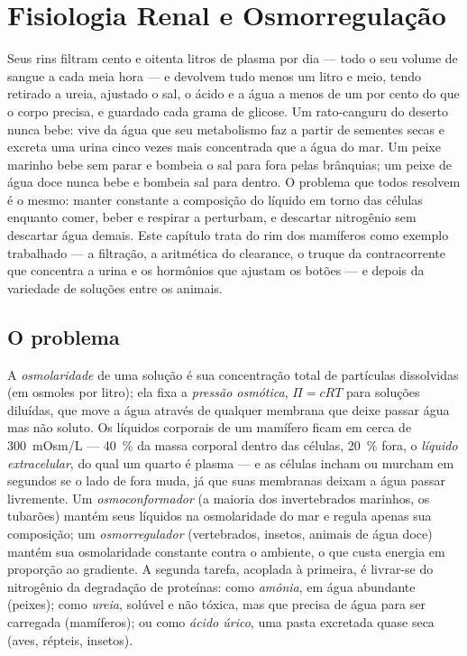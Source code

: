 \chapter{Fisiologia Renal e Osmorregulação}\label{ch:b3:renal-osmoregulation}

Seus rins filtram cento e oitenta litros de plasma por dia --- todo o
seu volume de sangue a cada meia hora --- e devolvem tudo menos um litro
e meio, tendo retirado a ureia, ajustado o sal, o ácido e a água a menos
de um por cento do que o corpo precisa, e guardado cada grama de
glicose. Um rato-canguru do deserto nunca bebe: vive da água que seu
metabolismo faz a partir de sementes secas e excreta uma urina cinco
vezes mais concentrada que a água do mar. Um peixe marinho bebe sem
parar e bombeia o sal para fora pelas brânquias; um peixe de água doce
nunca bebe e bombeia sal para dentro. O problema que todos resolvem é o
mesmo: manter constante a composição do líquido em torno das células
enquanto comer, beber e respirar a perturbam, e descartar nitrogênio sem
descartar água demais. Este capítulo trata do rim dos mamíferos como
exemplo trabalhado --- a filtração, a aritmética do clearance, o truque
da contracorrente que concentra a urina e os hormônios que ajustam os
botões --- e depois da variedade de soluções entre os animais.

\section{O problema}

\begin{definition}[Osmorregulação]\label{def:b3:renal-osmoregulation:problem}
A \emph{osmolaridade} de uma solução é sua concentração total de
partículas dissolvidas (em osmoles por litro); ela fixa a \emph{pressão
osmótica}, $\Pi = cRT$ para soluções diluídas, que move a água através
de qualquer membrana que deixe passar água mas não soluto. Os líquidos
corporais de um mamífero ficam em cerca de \qty{300}{mOsm/L} ---
\qty{40}{\%} da massa corporal dentro das células, \qty{20}{\%} fora, o
\emph{líquido extracelular}, do qual um quarto é plasma --- e as células
incham ou murcham em segundos se o lado de fora muda, já que suas
membranas deixam a água passar livremente. Um \emph{osmoconformador} (a
maioria dos invertebrados marinhos, os tubarões) mantém seus líquidos na
osmolaridade do mar e regula apenas sua composição; um
\emph{osmorregulador} (vertebrados, insetos, animais de água doce)
mantém sua osmolaridade constante contra o ambiente, o que custa energia
em proporção ao gradiente. A segunda tarefa, acoplada à primeira, é
livrar-se do nitrogênio da degradação de proteínas: como \emph{amônia},
em água abundante (peixes); como \emph{ureia}, solúvel e não tóxica, mas
que precisa de água para ser carregada (mamíferos); ou como \emph{ácido
úrico}, uma pasta excretada quase seca (aves, répteis, insetos).
\end{definition}

